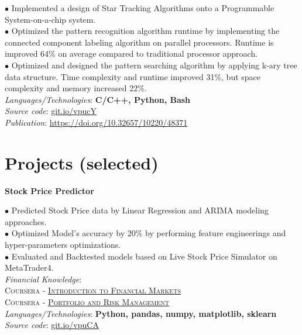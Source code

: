 \documentclass[10pt]{article}
\begin{document}
        \vspace{-5mm}

        $\bullet$ {Implemented a design of Star Tracking Algorithms onto a Programmable System-on-a-chip system. }\\
        $\bullet$ {Optimized the pattern recognition algorithm runtime by implementing the connected component labeling algorithm on parallel processors. Runtime is improved 64\% on average compared to traditional processor approach.} \\
        $\bullet$ {Optimized and designed the pattern searching algorithm by applying k-ary tree data structure. Time complexity and runtime improved 31\%, but space complexity and memory increased 22\%.} \\
        \emph{Languages/Technologies}: \textbf{C/C++, Python, Bash}\\
        \emph{Source code}: \href{https://git.io/vpucY}{git.io/vpucY} \\
        \emph{Publication}: \href{https://doi.org/10.32657/10220/48371}{https://doi.org/10.32657/10220/48371}


    \vspace{-2mm}
    \section{Projects (selected)}
        \vspace{-2mm}

        \begin{center}
            \textbf{Stock Price Predictor}
        \end{center}
        $\bullet$ {Predicted Stock Price data by Linear Regression and ARIMA modeling approaches.} \\
        $\bullet$ {Optimized Model's accuracy by 20\% by performing feature engineerings and hyper-parameters optimizations.} \\
        $\bullet$ {Evaluated and Backtested models based on Live Stock Price Simulator on MetaTrader4.} \\
        \emph{Financial Knowledge}: \\
            \hspace*{5mm} \textsc{Coursera - \href{https://www.coursera.org/account/accomplishments/certificate/K8F27A8BM58Q?utm_medium=certificate&utm_source=link&utm_campaign=copybutton_certificate}{Introduction to Financial Markets}} \\
            \hspace*{5mm} \textsc{Coursera - \href{https://www.coursera.org/account/accomplishments/certificate/34BTLCR3KZNR?utm_medium=certificate&utm_source=link&utm_campaign=copybutton_certificate}{Portfolio and Risk Management}} \\
        \emph{Languages/Technologies}: \textbf{Python, pandas, numpy, matplotlib, sklearn} \\
        \emph{Source code}: \href{https://git.io/vpuCA}{git.io/vpuCA}
\end{document}
